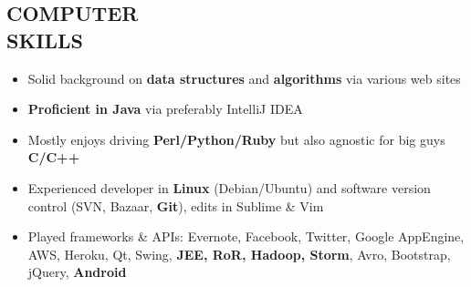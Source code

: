 \documentclass[line, margin]{res}
\begin{document}
\begin{resume}
\section{COMPUTER \\ SKILLS} 
	\begin{itemize}
		\item Solid background on \textbf{data structures} and \textbf{algorithms} via various web sites
		\item \textbf{Proficient in Java} via preferably IntelliJ IDEA
		\item Mostly enjoys driving \textbf{Perl/Python/Ruby} but also agnostic for big guys \textbf{C/C++}
		\item Experienced developer in \textbf{Linux} (Debian/Ubuntu) and software version control (SVN, Bazaar, \textbf{Git}), edits in Sublime \& Vim
		\item Played frameworks \& APIs: Evernote, Facebook, Twitter, Google AppEngine, AWS, Heroku, Qt, Swing,  \textbf{JEE, RoR, Hadoop, Storm}, Avro, Bootstrap, jQuery, \textbf{Android}
	\end{itemize}
\end{resume}
\end{document}

